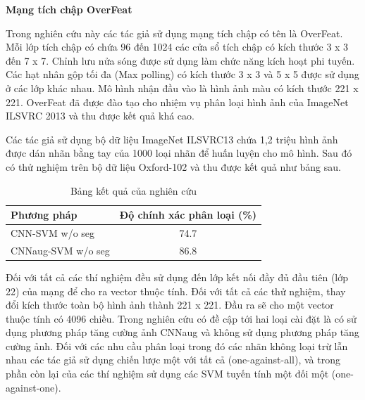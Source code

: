 \documentclass[12pt]{report}
\begin{document}
		\textbf{Mạng tích chập OverFeat \cite{cia-CNNFeatures off-the-shelf}}
		
		Trong nghiên cứu này \cite{cia-CNNFeatures off-the-shelf} các tác giả sử dụng mạng tích chập có tên là OverFeat. Mỗi lớp tích chập có chứa 96 đến 1024 các cửa sổ tích chập có kích thước 3 x 3 đến 7 x 7. Chỉnh lưu nửa sóng được sử dụng làm chức năng kích hoạt phi tuyến. Các hạt nhân gộp tối đa (Max polling) có kích thước 3 x 3 và 5 x 5 được sử dụng ở các lớp khác nhau. Mô hình nhận đầu vào là hình ảnh màu có kích thước 221 x 221. OverFeat đã được đào tạo cho nhiệm vụ phân loại hình ảnh của ImageNet ILSVRC 2013 và thu được kết quả khá cao.
																										
		Các tác giả sử dụng bộ dữ liệu ImageNet ILSVRC13 \cite{cia_ImageNet ILSVRC 2013} chứa 1,2 triệu hình ảnh được dán nhãn bằng tay của 1000 loại nhãn để huấn luyện cho mô hình. Sau đó có thử nghiệm trên bộ dữ liệu Oxford-102 \cite{cia-Nilsback02} và thu được kết quả như bảng sau.
																										
		\begin{table}[h]
			\centering
			\caption{Bảng kết quả của nghiên cứu \cite{cia-CNNFeatures off-the-shelf}}
			\label{tbl:table ket qua cua cnn_feature}
			\begin{tabular}{|l|c|}
				\hline
				\textbf{Phương pháp} & \textbf{Độ chính xác phân loại (\%)} \\ \hline
				CNN-SVM w/o seg         & 74.7                                         \\ \hline
				CNNaug-SVM w/o seg      & 86.8                                         \\ \hline
																																																																																												
			\end{tabular}
		\end{table}
																								
		Đối với tất cả các thí nghiệm đều sử dụng đến lớp kết nối đầy đủ đầu tiên (lớp 22) của mạng để cho ra vector thuộc tính. Đối với tất cả các thử nghiệm, thay đổi kích thước toàn bộ hình ảnh thành 221 x 221. Đầu ra sẽ cho một vector thuộc tính có 4096 chiều. Trong nghiên cứu có đề cập tới hai loại cài đặt là có sử dụng phương pháp tăng cường ảnh CNNaug và không sử dụng phương pháp tăng cường ảnh. Đối với các nhu cầu phân loại trong đó các nhãn không loại trừ lẫn nhau các tác giả sử dụng chiến lược một với tất cả (one-against-all), và trong phần còn lại của các thí nghiệm sử dụng các SVM tuyến tính một đối một (one-against-one).
																								
\end{document}
